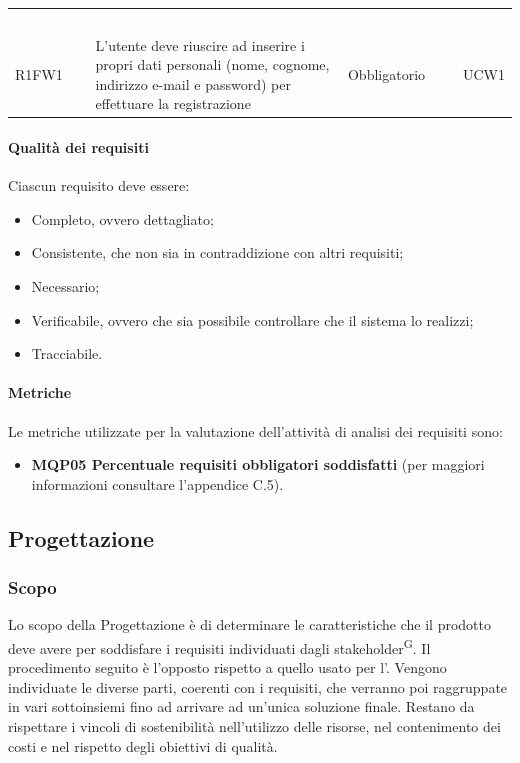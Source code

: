 \begin{table}[!htbp]
\renewcommand{\arraystretch}{1.5}
\begin{tabular}{ m{}<{\centering}  m{}<{\centering}  m{}<{\centering}  m{}<{\centering}}
    \rowcolor{darkblue}
    \textcolor{white}{\textbf{Requisito}} &\textcolor{white}{\textbf{Descrizione}}& \textcolor{white}{\textbf{Classificazione}} & \textcolor{white}{\textbf{Fonti}}\\ 

    \rowcolor{gray!25} R1FW1 & L’utente deve riuscire ad inserire i propri dati personali (nome, cognome, indirizzo e-mail e password) per effettuare la registrazione & Obbligatorio & UCW1 \\

\end{tabular}
\end{table}

\paragraph{Qualità dei requisiti}
Ciascun requisito deve essere:
\begin{itemize}
  \item Completo, ovvero dettagliato;
  \item Consistente, che non sia in contraddizione con altri requisiti;
  \item Necessario;
  \item Verificabile, ovvero che sia possibile controllare che il sistema lo realizzi;
  \item Tracciabile.
\end{itemize}

\paragraph{Metriche}
Le metriche utilizzate per la valutazione dell'attività di analisi dei requisiti sono:
\begin{itemize}
\item \textbf{MQP05 Percentuale requisiti obbligatori soddisfatti} (per maggiori informazioni consultare l'appendice C.5).
\end{itemize}

\subsection{Progettazione}
\subsubsection{Scopo}
Lo scopo della Progettazione è di determinare le caratteristiche che il prodotto deve avere per soddisfare i requisiti individuati dagli stakeholder\textsuperscript{G}. Il procedimento seguito è l'opposto rispetto a quello usato per l'\AdR. Vengono individuate le diverse parti, coerenti con i requisiti, che verranno poi raggruppate in vari sottoinsiemi fino ad arrivare ad un'unica soluzione finale. Restano da rispettare i vincoli di sostenibilità nell'utilizzo delle risorse, nel contenimento dei costi e nel rispetto degli obiettivi di qualità.

